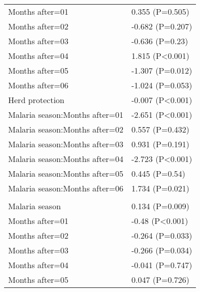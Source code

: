 \documentclass[]{article}
\begin{document}
\begin{longtable}[t]{ll}
\hspace{1em}Months after=01 & 0.355 (P=0.505)\\
\hspace{1em}Months after=02 & -0.682 (P=0.207)\\
\hspace{1em}Months after=03 & -0.636 (P=0.23)\\
\hspace{1em}Months after=04 & 1.815 (P<0.001)\\
\hspace{1em}Months after=05 & -1.307 (P=0.012)\\
\hspace{1em}Months after=06 & -1.024 (P=0.053)\\
\hspace{1em}Herd protection & -0.007 (P<0.001)\\
\hspace{1em}Malaria season:Months after=01 & -2.651 (P<0.001)\\
\hspace{1em}Malaria season:Months after=02 & 0.557 (P=0.432)\\
\hspace{1em}Malaria season:Months after=03 & 0.931 (P=0.191)\\
\hspace{1em}Malaria season:Months after=04 & -2.723 (P<0.001)\\
\hspace{1em}Malaria season:Months after=05 & 0.445 (P=0.54)\\
\hspace{1em}Malaria season:Months after=06 & 1.734 (P=0.021)\\
\addlinespace[1.5em]
\multicolumn{2}{l}{\textbf{Temporary field worker}}\\
\hspace{1em}Malaria season & 0.134 (P=0.009)\\
\hspace{1em}Months after=01 & -0.48 (P<0.001)\\
\hspace{1em}Months after=02 & -0.264 (P=0.033)\\
\hspace{1em}Months after=03 & -0.266 (P=0.034)\\
\hspace{1em}Months after=04 & -0.041 (P=0.747)\\
\hspace{1em}Months after=05 & 0.047 (P=0.726)\\

\end{longtable}
\end{document}
